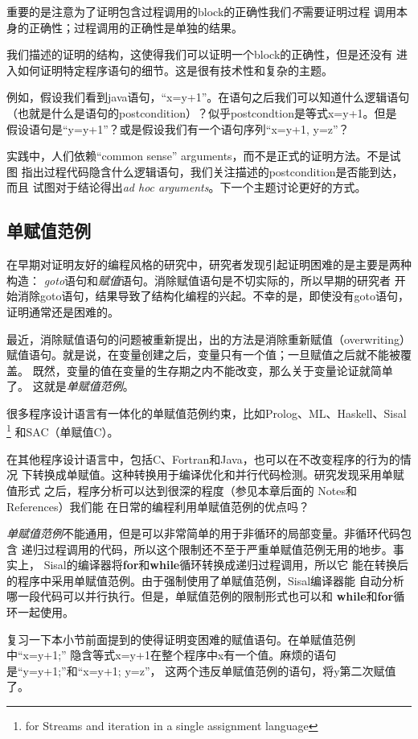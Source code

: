 重要的是注意为了证明包含过程调用的block的正确性我们\emph{不}需要证明过程
调用本身的正确性；过程调用的正确性是单独的结果。

我们描述的证明的结构，这使得我们可以证明一个block的正确性，但是还没有
进入如何证明特定程序语句的细节。这是很有技术性和复杂的主题。

例如，假设我们看到java语句，“x=y+1”。在语句之后我们可以知道什么逻辑语句
（也就是什么是语句的postcondition）？似乎postcondtion是等式x=y+1。但是
假设语句是“y=y+1”？或是假设我们有一个语句序列“x=y+1, y=z”？

实践中，人们依赖“common sense” arguments，而不是正式的证明方法。不是试图
指出过程代码隐含什么逻辑语句，我们关注描述的postcondition是否能到达，而且
试图对于结论得出\emph{ad hoc arguments}。下一个主题讨论更好的方式。


\subsection{单赋值范例}\label{Sec:ParadigmOfSingleAssignment}
在早期对证明友好的编程风格的研究中，研究者发现引起证明困难的是主要是两种构造：
\emph{goto}语句和\emph{赋值}语句。消除赋值语句是不切实际的，所以早期的研究者
开始消除goto语句，结果导致了结构化编程的兴起。不幸的是，即使没有goto语句，
证明通常还是困难的。

最近，消除赋值语句的问题被重新提出，出的方法是消除重新赋值（overwriting）
赋值语句。就是说，在变量创建之后，变量只有一个值；一旦赋值之后就不能被覆盖。
既然，变量的值在变量的生存期之内不能改变，那么关于变量论证就简单了。
这就是\emph{单赋值范例}。

很多程序设计语言有一体化的单赋值范例约束，比如Prolog、ML、Haskell、Sisal
\footnote{for Streams and iteration in a single assignment language}
和SAC（单赋值C）。

在其他程序设计语言中，包括C、Fortran和Java，也可以在不改变程序的行为的情况
下转换成单赋值。这种转换用于编译优化和并行代码检测。研究发现采用单赋值形式
之后，程序分析可以达到很深的程度（参见本章后面的 Notes和References）我们能
在日常的编程利用单赋值范例的优点吗？

\emph{单赋值范例}不能通用，但是可以非常简单的用于非循环的局部变量。非循环代码包含
递归过程调用的代码，所以这个限制还不至于严重单赋值范例无用的地步。事实上，
Sisal的编译器将\textbf{for}和\textbf{while}循环转换成递归过程调用，所以它
能在转换后的程序中采用单赋值范例。由于强制使用了单赋值范例，Sisal编译器能
自动分析哪一段代码可以并行执行。但是，单赋值范例的限制形式也可以和
\textbf{while}和\textbf{for}循环一起使用。

复习一下本小节前面提到的使得证明变困难的赋值语句。在单赋值范例中“x=y+1;”
隐含等式x=y+1在整个程序中x有一个值。麻烦的语句是“y=y+1;”和“x=y+1; y=z”，
这两个违反单赋值范例的语句，将y第二次赋值了。

